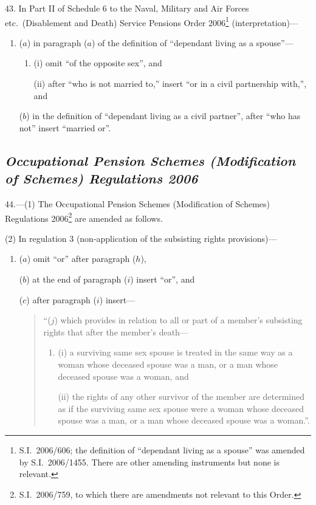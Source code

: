 \documentclass[12pt,a4paper]{article}
\begin{document}
43.  In Part II of Schedule 6 to the Naval, Military and Air Forces etc.\ (Disablement and Death) Service Pensions Order 2006\footnote{S.I.~2006/606; the definition of “dependant living as a spouse” was amended by S.I.~2006/1455. There are other amending instruments but none is relevant.} (interpretation)—
\begin{enumerate}\item[]
($a$) in paragraph ($a$)  of the definition of “dependant living as a spouse”—
\begin{enumerate}\item[]
(i) omit “of the opposite sex”, and

(ii) after “who is not married to,” insert “or in a civil partnership with,”, and
\end{enumerate}

($b$) in the definition of “dependant living as a civil partner”, after “who has not” insert “married or”.
\end{enumerate}

\subsection*{\itshape\sloppy{} Occupational Pension Schemes (Modification of Schemes) Regulations 2006}

44.—(1) The Occupational Pension Schemes (Modification of Schemes) Regulations 2006\footnote{S.I.~2006/759, to which there are amendments not relevant to this Order.} are amended as follows.

(2) In regulation 3 (non-application of the subsisting rights provisions)—
\begin{enumerate}\item[]
($a$) omit “or” after paragraph ($h$),

($b$) at the end of paragraph ($i$)  insert “or”, and

($c$) after paragraph ($i$)  insert—
\begin{quotation}
“($j$) which provides in relation to all or part of a member’s subsisting rights that after the member’s death—
\begin{enumerate}\item[]
(i) a surviving same sex spouse is treated in the same way as a woman whose deceased spouse was a man, or a man whose deceased spouse was a woman, and

(ii) the rights of any other survivor of the member are determined as if the surviving same sex spouse were a woman whose deceased spouse was a man, or a man whose deceased spouse was a woman.”.
\end{enumerate}
\end{quotation}
\end{enumerate}
\end{document}

